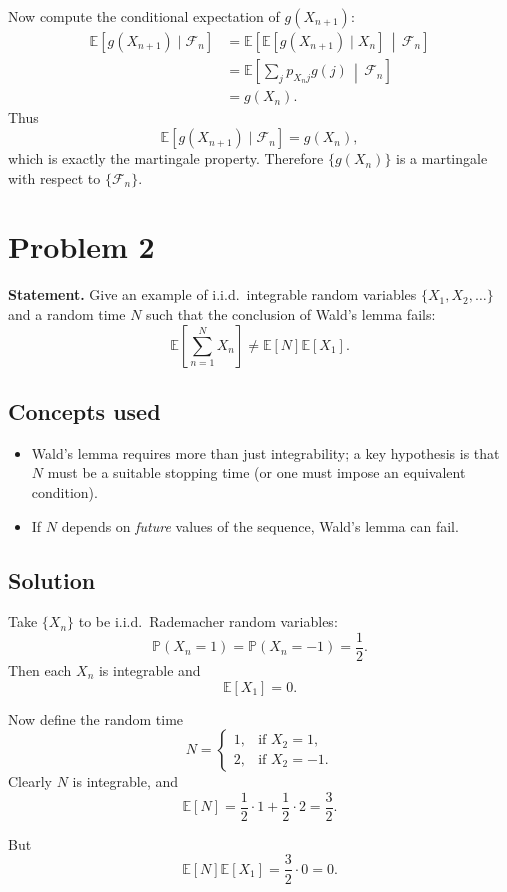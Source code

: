 \documentclass[11pt]{article}
\newcommand{\EE}{\mathbb{E}}
\newcommand{\PP}{\mathbb{P}}
\newcommand{\cF}{\mathcal{F}}
\begin{document}
Now compute the conditional expectation of $g(X_{n+1})$:
\begin{align*}
\EE[g(X_{n+1}) \mid \cF_n]
&= \EE\!\left[\EE[g(X_{n+1}) \mid X_n] \,\middle|\, \cF_n\right] \\
&= \EE\!\left[\sum_j p_{X_n j} g(j) \,\middle|\, \cF_n\right] \\
&= g(X_n).
\end{align*}
Thus
\[
\EE[g(X_{n+1}) \mid \cF_n] = g(X_n),
\]
which is exactly the martingale property. Therefore $\{g(X_n)\}$ is a martingale with
respect to $\{\cF_n\}$.

\section*{Problem 2}

\textbf{Statement.} Give an example of i.i.d.\ integrable random variables
$\{X_1,X_2,\dots\}$ and a random time $N$ such that the conclusion of Wald's lemma fails:
\[
\EE\left[\sum_{n=1}^N X_n\right] \ne \EE[N]\EE[X_1].
\]

\subsection*{Concepts used}

\begin{itemize}
\item Wald's lemma requires more than just integrability; a key hypothesis is that $N$ must be
      a suitable stopping time (or one must impose an equivalent condition).
\item If $N$ depends on \emph{future} values of the sequence, Wald's lemma can fail.
\end{itemize}

\subsection*{Solution}

Take $\{X_n\}$ to be i.i.d.\ Rademacher random variables:
\[
\PP(X_n=1)=\PP(X_n=-1)=\frac12.
\]
Then each $X_n$ is integrable and
\[
\EE[X_1]=0.
\]

Now define the random time
\[
N=
\begin{cases}
1, & \text{if } X_2=1,\\
2, & \text{if } X_2=-1.
\end{cases}
\]
Clearly $N$ is integrable, and
\[
\EE[N]=\frac12\cdot 1+\frac12\cdot 2=\frac32.
\]

But
\[
\EE[N]\EE[X_1] = \frac32 \cdot 0 = 0.
\]
\end{document}

